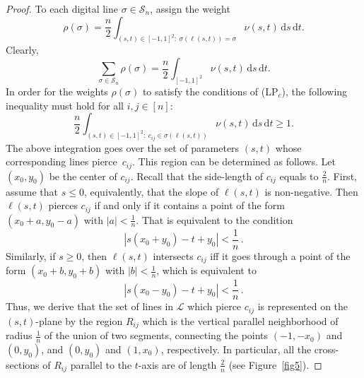 \documentclass[11pt,a4paper]{amsart}
\newcommand{\dd}{\,\mathrm{d}}
\newcommand{\Sc}{\mathcal{S}}
\newcommand{\Lc}{\mathcal{L}}
\begin{document}
\begin{proof}
To each  digital line $\sigma \in \Sc_n$, assign the weight
\begin{equation}\label{rhodef}
  \rho(\sigma) = \frac n 2 \int_{(s,t) \in [-1,1]^2: \ \sigma(\ell(s,t)) = \sigma  } \nu(s,t) \dd s \dd t.
\end{equation}
Clearly,
\begin{equation}
\label{nuint}
\sum_{\sigma \in \Sc_n} \rho(\sigma) = \frac n 2 \int_{[-1,1]^2} \nu(s,t) \dd s \dd t.
\end{equation}
In order for the weights $\rho(\sigma)$ to satisfy the conditions of (LP$_c$), the following inequality must hold for all $i,j \in [n]$:
\begin{equation}
\label{nucond}
\frac n 2 \int_{(s,t) \in [-1,1]^2: \ c_{ij} \in \sigma(\ell(s,t)) } \nu(s,t) \dd s \dd t
 \geq 1.
\end{equation}
The above integration goes over the set of parameters $(s,t)$ whose corresponding lines pierce~$c_{ij}$. This region can be determined as follows. Let $(x_0, y_0)$ be the center of $c_{ij}$. Recall that the side-length of $c_{ij}$ equals to $\frac 2 n$. First, assume that $s \leq 0$, equivalently, that the slope of $\ell(s,t)$ is non-negative. Then $\ell(s,t)$ pierces $c_{ij}$ if and only if it contains a point of the form $(x_0 + a, y_0 - a)$ with $|a| < \frac 1 n $. That is equivalent to the condition
\[
|s (x_0 + y_0) - t + y_0| < \frac 1 n \,.
\]
Similarly, if $s \geq 0$, then $\ell(s,t)$ intersects $c_{ij}$ iff it goes through a point of the form $(x_0 + b, y_0 + b)$ with $|b| < \frac 1 n $, which is equivalent to
\[
|s (x_0 - y_0) - t + y_0| < \frac 1 n \,.
\]
Thus, we derive that the set of lines in $\Lc$ which pierce $c_{ij}$ is represented on the $(s,t)$-plane by the region $R_{ij}$ which is the vertical parallel neighborhood of radius $\frac 1 n$ of the union of two segments, connecting the points $(-1, -x_0)$ and $(0, y_0)$, and $(0,y_0)$ and $(1, x_0)$, respectively. In particular, all the cross-sections of $R_{ij}$ parallel to the $t$-axis are of length $\frac 2 n$ (see Figure~\ref{fig5}).







\end{proof}
\end{document}
